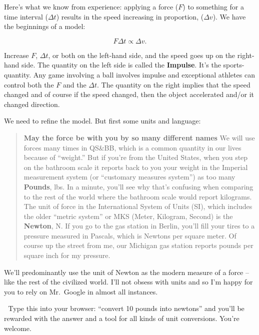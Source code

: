 \documentclass[
  letterpaper,
  DIV=11,
  numbers=noendperiod,
  oneside]{scrreprt}
\begin{document}
Here's what we know from experience: applying a force (\(F\)) to
something for a time interval (\(\Delta t\)) results in the speed
increasing in proportion, (\(\Delta v\)). We have the beginnings of a
model:

\[
\begin{equation}
F\Delta t \propto \Delta v. \label{eq:impulse1}
\end{equation}
\]

Increase \(F\), \(\Delta t\), or both on the left-hand side, and the
speed goes up on the right-hand side. The quantity on the left side is
called the \textbf{Impulse}. It's the sports-quantity. Any game
involving a ball involves impulse and exceptional athletes can control
both the \(F\) and the \(\Delta t\). The quantity on the right implies
that the speed changed and of course if the speed changed, then the
object accelerated and/or it changed direction.

We need to refine the model. But first some units and language:

\begin{quote}
\textbf{May the force be with you by so many different names} We will
use forces many times in QS\&BB, which is a common quantity in our lives
because of ``weight.'' But if you're from the United States, when you
step on the bathroom scale it reports back to you your weight in the
Imperial measurement system (or ``customary measures system'') as too
many \textbf{Pounds}, lbs. In a minute, you'll see why that's confusing
when comparing to the rest of the world where the bathroom scale would
report kilograms. The unit of force in the International System of Units
(SI), which includes the older ``metric system'' or MKS (Meter,
Kilogram, Second) is the \textbf{Newton}, N. If you go to the gas
station in Berlin, you'll fill your tires to a pressure measured in
Pascals, which is Newtons per square meter. Of course up the street from
me, our Michigan gas station reports pounds per square inch for my
pressure.
\end{quote}

We'll predominantly use the unit of Newton as the modern measure of a
force -- like the rest of the civilized world. I'll not obsess with
units and so I'm happy for you to rely on Mr.~Google in almost all
instances.

\begin{tcolorbox}[enhanced jigsaw, toprule=.15mm, opacityback=0, colframe=quarto-callout-important-color-frame, rightrule=.15mm, coltitle=black, bottomtitle=1mm, colbacktitle=quarto-callout-important-color!10!white, bottomrule=.15mm, toptitle=1mm, titlerule=0mm, title={Important}, arc=.35mm, leftrule=.75mm, left=2mm, colback=white, breakable, opacitybacktitle=0.6]

🔐 Type this into your browser: ``convert 10 pounds into newtons'' and
you'll be rewarded with the answer and a tool for all kinds of unit
conversions. You're welcome.

\end{tcolorbox}
\end{document}
